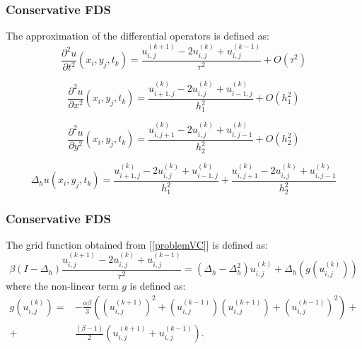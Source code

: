 \documentclass{beamer}
\begin{document}

\begin{frame}
\frametitle{Conservative FDS}
The approximation of the differential operators is defined as:
\begin{equation}
\frac{\partial^2 u}{\partial t^2}(x_i, y_j, t_k ) = \frac{ u^{(k+1)}_{i, j} - 2u^{(k)}_{i,j} + u^{(k-1)}_{i,j} }{\tau^2} + O(\tau^2) 
\end{equation}

\begin{equation}
\frac{\partial^2 u}{\partial x^2}(x_i, y_j, t_k ) = \frac{ u^{(k)}_{i+1, j} - 2u^{(k)}_{i,j} + u^{(k)}_{i-1,j} }{h_1^2} + O(h_1^2) 
\end{equation}

\begin{equation}
\frac{\partial^2 u}{\partial y^2}(x_i, y_j, t_k ) = \frac{ u^{(k)}_{i, j+1} - 2u^{(k)}_{i,j} + u^{(k)}_{i,j-1} }{h_2^2} + O(h_2^2) 
\end{equation}


\begin{equation}
\Delta_h u(x_i, y_j, t_k )  = \frac{ u^{(k)}_{i+1, j} - 2u^{(k)}_{i,j} + u^{(k)}_{i-1,j} }{h_1^2} + \frac{ u^{(k)}_{i, j+1} - 2u^{(k)}_{i,j} + u^{(k)}_{i,j-1} }{h_2^2}
\end{equation}

\end{frame}


\begin{frame}
\frametitle{Conservative FDS}
The grid function obtained from [\ref{problemVC}] is defined as:
\begin{equation}
\beta (I-\Delta_h)\frac{ u^{(k+1)}_{i, j} - 2u^{(k)}_{i,j} + u^{(k-1)}_{i,j} }{\tau^2} = (\Delta_h - \Delta_h^2)u^{(k)}_{i,j} + \Delta_h(g(u^{(k)}_{i,j}))
\end{equation}
%
where the non-linear term $g$ is defined as:
\begin{align}
g(u^{(k)}_{i,j})=& -\frac{\alpha \beta} { 3 } \left( (u^{(k+1)}_{i,j})^2 + (u^{(k-1)}_{i,j})(u^{(k+1)}_{i,j}) + (u^{(k-1)}_{i,j})^2 \right) + \nonumber\\
+&\frac{ (\beta - 1 )}{ 2 }\left( u^{(k+1)}_{i,j} + u^{(k-1)}_{i,j} \right).
\end{align}


\end{frame}


\end{document}
